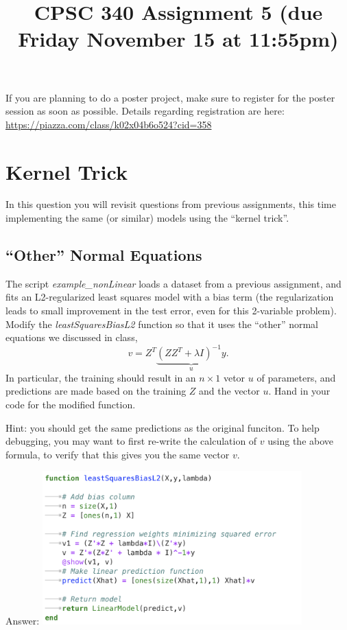 \documentclass{article}
\def\ans#1{\par\gre{Answer: #1}}
\def\blu#1{{\color{blu}#1}}
\def\gre#1{{\color{gre}#1}}
\def\red#1{{\color{red}#1}}
\begin{document}
\title{CPSC 340 Assignment 5 (due Friday November 15 at 11:55pm)}
\author{}
\date{}
\maketitle
\vspace{-4em}


\red{If you are planning to do a poster project, make sure to register for the poster session as soon as possible. Details regarding registration are here:\\
\url{https://piazza.com/class/k02x04b6o524?cid=358}
}


\section{Kernel Trick}

In this question you will revisit questions from previous assignments, this time implementing the same (or similar) models using the ``kernel trick''.

\subsection{``Other'' Normal Equations}

The script \emph{example\_nonLinear} loads a dataset from a previous assignment, and fits an L2-regularized least squares model with a bias term (the regularization leads to small improvement in the test error, even for this 2-variable problem). Modify the \emph{leastSquaresBiasL2} function so that it uses the ``other'' normal equations we discussed in class,
\[
v = Z^T\underbrace{(ZZ^T + \lambda I)^{-1}y}_u.
\]
In particular, the training should result in an $n \times 1$ vetor $u$ of parameters, and predictions are made based on the training $Z$ and the vector $u$. \blu{Hand in your code for the modified function}.

Hint: you should get the same predictions as the original funciton. To help debugging, you may want to first re-write the calculation of $v$ using the above formula, to verify that this gives you the same vector $v$.
\ans{\includegraphics[width=10cm]{Q11.png}}
\end{document}

